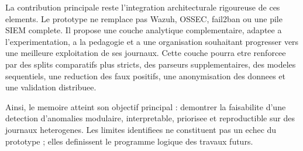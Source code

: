 La contribution principale reste l'integration architecturale rigoureuse de ces elements. Le prototype ne remplace pas Wazuh, OSSEC, fail2ban ou une pile SIEM complete. Il propose une couche analytique complementaire, adaptee a l'experimentation, a la pedagogie et a une organisation souhaitant progresser vers une meilleure exploitation de ses journaux. Cette couche pourra etre renforcee par des splits comparatifs plus stricts, des parseurs supplementaires, des modeles sequentiels, une reduction des faux positifs, une anonymisation des donnees et une validation distribuee.

Ainsi, le memoire atteint son objectif principal : demontrer la faisabilite d'une detection d'anomalies modulaire, interpretable, priorisee et reproductible sur des journaux heterogenes. Les limites identifiees ne constituent pas un echec du prototype ; elles definissent le programme logique des travaux futurs.
